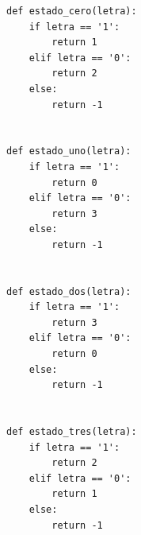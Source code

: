 \documentclass[12pt]{article}
\begin{document}
\begin{lstlisting}[frame=single]
def estado_cero(letra):
    if letra == '1':
        return 1
    elif letra == '0':
        return 2
    else:
        return -1


def estado_uno(letra):
    if letra == '1':
        return 0
    elif letra == '0':
        return 3
    else:
        return -1


def estado_dos(letra):
    if letra == '1':
        return 3
    elif letra == '0':
        return 0
    else:
        return -1


def estado_tres(letra):
    if letra == '1':
        return 2
    elif letra == '0':
        return 1
    else:
        return -1

\end{lstlisting}

\vspace{1em}
\end{document}

